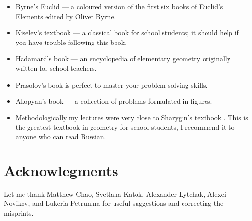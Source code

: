 \begin{itemize}
\item Byrne's Euclid \cite{byrne} --- a coloured version of the first six books of Euclid's Elements edited by Oliver Byrne. 

\item Kiselev's textbook \cite{kiselev} ---
a classical book for school students; it should help if you have trouble following this book.

\item Hadamard's book \cite{hadamard} --- an encyclopedia of elementary geometry originally written for school teachers.



\item Prasolov's book \cite{prasolov} is perfect to master your problem-solving skills.

\item Akopyan's book \cite{akopyan} --- a collection of problems formulated in figures.

\item Methodologically my lectures
were very close to Sharygin's  textbook \cite{sharygin}.
This is the greatest textbook in geometry for school students,
I recommend it to anyone who can read Russian.


\end{itemize}

\section*{Acknowlegments}

Let me thank  
Matthew Chao, 
Svetlana Katok, 
Alexander Lytchak,
Alexei Novi\-kov,
and Lukeria Petrunina
for useful suggestions and correcting the misprints.







